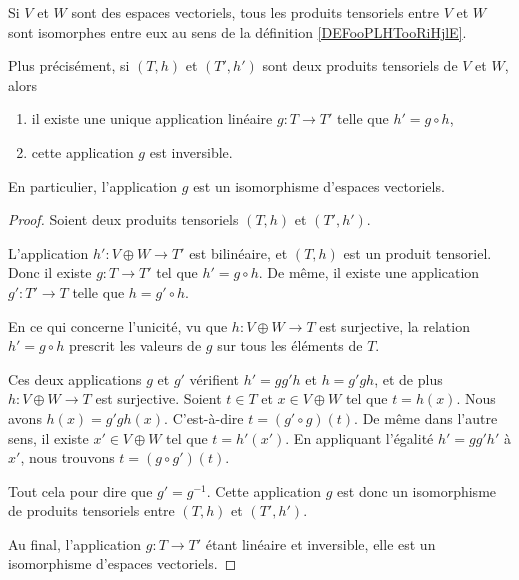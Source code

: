 \begin{proposition}      \label{PROPooROPHooQXqNzZ}
	Si \( V\) et \( W\) sont des espaces vectoriels, tous les produits tensoriels entre \( V\) et \( W\) sont isomorphes entre eux au sens de la définition \ref{DEFooPLHTooRiHjlE}.

	Plus précisément, si \( (T,h)\) et \( (T',h')\) sont deux produits tensoriels de \( V\) et \( W\), alors
	\begin{enumerate}
		\item
		      il existe une unique application linéaire \( g\colon T\to T'\) telle que \( h'=g\circ h\),
		\item
		      cette application \( g\) est inversible.
	\end{enumerate}
	En particulier, l'application \( g\) est un isomorphisme d'espaces vectoriels.
\end{proposition}

\begin{proof}
	Soient deux produits tensoriels \( (T,h)\) et \( (T',h')\).

	\begin{subproof}
		\spitem[Existence]

		L'application \( h'\colon V\oplus W\to T'\) est bilinéaire, et \( (T,h)\) est un produit tensoriel. Donc il existe \( g\colon T\to T'\) tel que \( h'=g\circ h\). De même, il existe une application \( g'\colon T'\to T\) telle que \( h=g'\circ h\).

		\spitem[Unicité]

		En ce qui concerne l'unicité, vu que \( h\colon V\oplus W\to T\) est surjective, la relation \( h'=g\circ h\) prescrit les valeurs de \( g\) sur tous les éléments de \( T\).

		\spitem[Inversible]

		Ces deux applications \( g\) et \( g'\) vérifient \( h'=gg'h\) et \( h=g'gh\), et de plus \( h\colon V\oplus W\to T\) est surjective. Soient \( t\in T\) et \( x\in V\oplus W\) tel que \( t=h(x)\). Nous avons \( h(x)=g'gh(x)\). C'est-à-dire \( t=(g'\circ g)(t)\). De même dans l'autre sens, il existe \( x'\in V\oplus W\) tel que \( t=h'(x')\). En appliquant l'égalité \( h'=gg'h'\) à \( x'\), nous trouvons \( t=(g\circ g')(t)\).

		Tout cela pour dire que \( g'=g^{-1}\). Cette application \( g\) est donc un isomorphisme de produits tensoriels entre \( (T,h)\) et \( (T',h')\).
	\end{subproof}
	Au final, l'application \( g\colon T\to T'\) étant linéaire et inversible, elle est un isomorphisme d'espaces vectoriels.
\end{proof}


